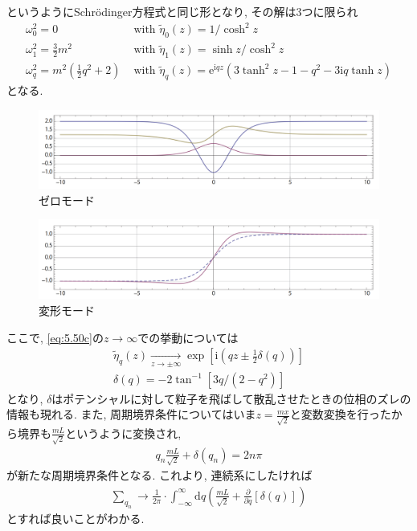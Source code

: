 \documentclass[dvipdfmx,11pt,a4paper,oneside,openany]{jsbook}
\begin{document}
というようにSchr\"{o}dinger方程式と同じ形となり, その解は3つに限られ
\begin{subequations}
    \begin{align}
        \omega_{0}^{2}=0                                     & \text { with } \tilde{\eta}_{0}(z)=1 / \cosh ^{2} z                                                                                     \\
        \omega_{1}^{2}=\frac{3}{2} m^{2}                     & \text { with } \tilde{\eta}_{1}(z)=\sinh z / \cosh ^{2} z                                                                               \\
        \omega_{q}^{2}=m^{2}\left(\frac{1}{2} q^{2}+2\right) & \text{ with } \tilde{\eta}_{q}(z)=\mathrm{e}^{\mathrm{i} q z}\left(3 \tanh ^{2} z-1-q^{2}-3 \mathrm{i} q \tanh z\right)\label{eq:5.50c}
    \end{align}
\end{subequations}
となる.
\begin{figure}[H]
    \centering
    \includegraphics[width=12cm]{figure/fig3.png}
    \caption{ゼロモード}
    \label{fig3}
\end{figure}
\begin{figure}[H]
    \centering
    \includegraphics[width=12cm]{figure/fig4.png}
    \caption{変形モード}
    \label{fig3}
\end{figure}
ここで, \eqref{eq:5.50c}の$z\rightarrow\infty$での挙動については
\begin{align}
    \tilde{\eta}_{q}(z) \underset{z \rightarrow \pm \infty}{\longrightarrow} \exp \left[\mathrm{i}\left(q z \pm \frac{1}{2} \delta(q)\right)\right]\label{eq:5.51} \\
    \delta(q)=-2 \tan ^{-1}\left[3 q /\left(2-q^{2}\right)\right]
\end{align}
となり, $\delta$はポテンシャルに対して粒子を飛ばして散乱させたときの位相のズレの情報も現れる. また, 周期境界条件についてはいま$z=\frac{mx}{\sqrt{2}}$と変数変換を行ったから境界も$\frac{mL}{\sqrt{2}}$というように変換され,
\begin{align}
    q_{n}\frac{mL}{\sqrt{2}}+\delta\left(q_{n}\right)=2 n \pi
\end{align}
が新たな周期境界条件となる. これより, 連続系にしたければ
\begin{align}
    \sum_{q_{n}} \rightarrow \frac{1}{2 \pi} \cdot \int_{-\infty}^{\infty} \mathrm{d} q\left(\frac{m L}{\sqrt{2}}+\frac{\partial}{\partial q}[\delta(q)]\right)
\end{align}
とすれば良いことがわかる.
\end{document}
